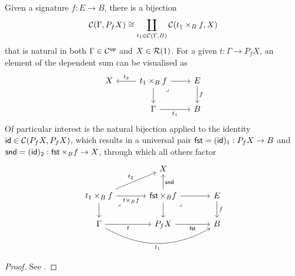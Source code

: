 \begin{proposition}\label{prop:poly-up}
  Given a signature $f : E \to B$,
  there is a bijection
  \[ \mathcal{C}(\Gamma, P_f X) \cong
    \coprod_{t_1 \in \mathcal{C}(\Gamma,B)}\mathcal{C}(t_1 \times_B f, X)\]
  that is natural in both $\Gamma \in \mathcal{C}^{\mathsf{op}}$ and $X \in \mathcal{R}(1)$.
  For a given $t : \Gamma \to P_f X$,
  an element of the dependent sum can be visualised as
\[\begin{tikzcd}
	X & {t_1 \times_B f} & E \\
	& \Gamma & B
	\arrow["t_2"', from=1-2, to=1-1]
	\arrow[from=1-2, to=1-3]
	\arrow[from=1-2, to=2-2]
	\arrow["\lrcorner"{anchor=center, pos=0.125}, draw=none, from=1-2, to=2-3]
	\arrow["f", from=1-3, to=2-3]
	\arrow["t_1"', from=2-2, to=2-3]
\end{tikzcd}\]
  Of particular interest is the natural bijection applied to
  the identity $\mathsf{id} \in \mathcal{C}(P_f X, P_f X)$,
  which results in a {universal} pair
  $\mathop{\mathsf{fst}} = (\mathsf{id})_1 : P_f X \to B$
  and $\mathop{\mathsf{snd}} = (\mathsf{id})_2 : \mathop{\mathsf{fst}} \times_B f \to X$,
  through which all others factor
\[\begin{tikzcd}[column sep = large]
	& X \\
	{t_1 \times_B f} & {\fstProj \times_B f} & E \\
	\Gamma & {P_f X} & B
	\arrow["{t_2}", from=2-1, to=1-2]
  \arrow["{t \times_B f}"', from=2-1, to=2-2]
	\arrow[from=2-1, to=3-1]
	\arrow["\lrcorner"{anchor=center, pos=0.125}, draw=none, from=2-1, to=3-2]
	\arrow["{\sndProj}"', from=2-2, to=1-2]
	\arrow[from=2-2, to=2-3]
	\arrow[from=2-2, to=3-2]
	\arrow["\lrcorner"{anchor=center, pos=0.125}, draw=none, from=2-2, to=3-3]
	\arrow["f", from=2-3, to=3-3]
	\arrow["t"', from=3-1, to=3-2]
	\arrow["{t_1}"', bend right, from=3-1, to=3-3]
	\arrow["{\fstProj}"', from=3-2, to=3-3]
\end{tikzcd}\]
\end{proposition}
\begin{proof}
  See \cite[Proposition 3.6]{hua2026}.
\end{proof}

